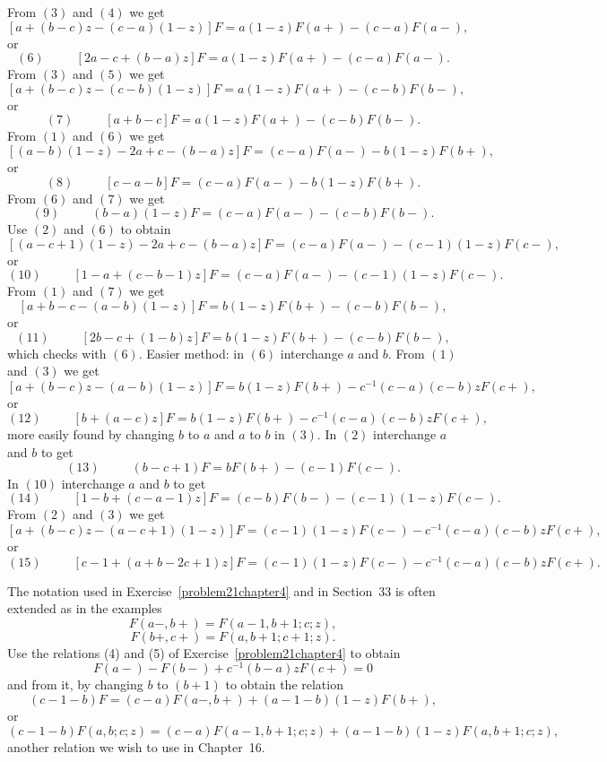 \begin{solution}
From $(3)$ and $(4)$ we get
$$[a + (b-c)z - (c-a)(1-z)]F = a(1-z)F(a+)-(c-a)F(a-),$$
or
$$(6) \hspace{30pt} [2a-c + (b-a)z]F = a(1-z)F(a+) - (c-a) F(a-).$$
From $(3)$ and $(5)$ we get
$$[a + (b-c)z - (c-b)(1-z)]F = a(1-z)F(a+) - (c-b)F(b-),$$
or
$$(7) \hspace{30pt} [a+b-c]F = a(1-z)F(a+) - (c-b)F(b-).$$
From $(1)$ and $(6)$ we get
$$[(a-b)(1-z) - 2a + c - (b-a)z]F = (c-a)F(a-) - b(1-z)F(b+),$$
or
$$(8) \hspace{30pt} [c-a-b]F = (c-a)F(a-) - b(1-z)F(b+).$$
From $(6)$ and $(7)$ we get
$$(9) \hspace{30pt} (b-a)(1-z)F = (c-a)F(a-)-(c-b)F(b-).$$
Use $(2)$ and $(6)$ to obtain
$$[(a-c+1)(1-z)-2a+c - (b-a)z]F = (c-a) F(a-) - (c-1)(1-z)F(c-),$$
or
$$(10) \hspace{30pt} [1-a+(c-b-1)z] F = (c-a)F(a-) - (c-1)(1-z)F(c-).$$
From $(1)$ and $(7)$ we get
$$[a+b-c-(a-b)(1-z)]F = b(1-z)F(b+) - (c-b)F(b-),$$
or
$$(11) \hspace{30pt} [2b-c+(1-b)z]F = b(1-z)F(b+) - (c-b)F(b-),$$
which checks with $(6)$. Easier method: in $(6)$ interchange $a$ and $b$.
From $(1)$ and $(3)$ we get
$$[a + (b-c)z - (a-b)(1-z)]F = b(1-z)F(b+) - c^{-1}(c-a)(c-b)zF(c+),$$
or
$$(12) \hspace{30pt} [b+(a-c)z]F = b(1-z)F(b+) - c^{-1}(c-a)(c-b)zF(c+),$$
more easily found by changing $b$ to $a$ and $a$ to $b$ in $(3)$.
In $(2)$ interchange $a$ and $b$ to get
$$(13) \hspace{30pt} (b-c+1)F = bF(b+) - (c-1)F(c-).$$
In $(10)$ interchange $a$ and $b$ to get
$$(14) \hspace{30pt} [1-b+(c-a-1)z]F = (c-b)F(b-) - (c-1)(1-z)F(c-).$$
From $(2)$ and $(3)$ we get
$$[a+(b-c)z-(a-c+1)(1-z)]F = (c-1)(1-z)F(c-)-c^{-1}(c-a)(c-b)zF(c+),$$
or
$$(15) \hspace{30pt} [c-1+(a+b-2c+1)z]F = (c-1)(1-z)F(c-) - c^{-1}(c-a)(c-b)zF(c+).$$
\end{solution}
\begin{problem}\label{problem22chapter4}
The notation used in Exercise~\ref{problem21chapter4} and in Section~33 is often extended as in the examples
$$F(a-,b+) = F(a-1,b+1;c;z),$$
$$F(b+,c+) = F(a,b+1;c+1;z).$$
Use the relations (4) and (5) of Exercise~\ref{problem21chapter4} to obtain
$$F(a-) - F(b-) + c^{-1}(b-a)zF(c+) = 0$$
and from it, by changing $b$ to $(b+1)$ to obtain the relation
$$(c-1-b)F = (c-a)F(a-,b+) + (a-1-b)(1-z)F(b+),$$
or
$$(c-1-b)F(a,b;c;z) = (c-a)F(a-1,b+1;c;z) + (a-1-b)(1-z)F(a,b+1;c;z),$$
another relation we wish to use in Chapter~16.
\end{problem}
